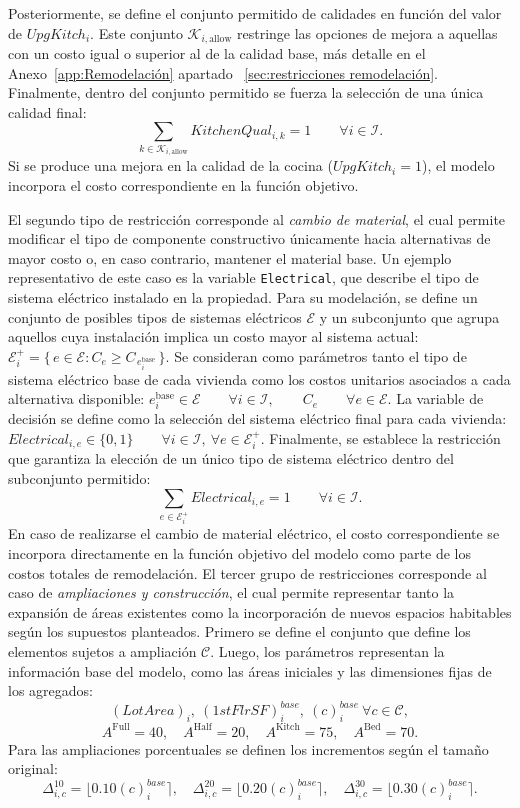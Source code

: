 Posteriormente, se define el conjunto permitido de calidades en función del valor de $UpgKitch_i$. Este conjunto $\mathcal{K}_{i,\text{allow}}$ restringe las opciones de mejora a aquellas con un costo igual o superior al de la calidad base, más detalle en el Anexo~\ref{app:Remodelación} apartado ~\ref{sec:restricciones remodelación}. Finalmente, dentro del conjunto permitido se fuerza la selección de una única calidad final:
\[
\sum_{k \in \mathcal{K}_{i,\text{allow}}} KitchenQual_{i,k} = 1 \qquad \forall i \in \mathcal{I}.
\]
Si se produce una mejora en la calidad de la cocina ($UpgKitch_i = 1$), el modelo incorpora el costo correspondiente en la función objetivo.

El segundo tipo de restricción corresponde al \textit{cambio de material}, el cual permite modificar el tipo de componente constructivo únicamente hacia alternativas de mayor costo o, en caso contrario, mantener el material base. Un ejemplo representativo de este caso es la variable \texttt{Electrical}, que describe el tipo de sistema eléctrico instalado en la propiedad. Para su modelación, se define un conjunto de posibles tipos de sistemas eléctricos $\mathcal{E}$ y un subconjunto que agrupa aquellos cuya instalación implica un costo mayor al sistema actual:
$\mathcal{E}^+_i = \{\, e \in \mathcal{E} : C_e \ge C_{\,e_i^{\text{base}}} \,\}.$ Se consideran como parámetros tanto el tipo de sistema eléctrico base de cada vivienda como los costos unitarios asociados a cada alternativa disponible:
$
e_i^{\text{base}} \in \mathcal{E} \qquad \forall i \in \mathcal{I},
\qquad
C_e \qquad \forall e \in \mathcal{E}.$
La variable de decisión se define como la selección del sistema eléctrico final para cada vivienda: $Electrical_{i,e} \in \{0,1\} \qquad \forall i \in \mathcal{I},\ \forall e \in \mathcal{E}^+_i.$
Finalmente, se establece la restricción que garantiza la elección de un único tipo de sistema eléctrico dentro del subconjunto permitido:
\[
\sum_{e \in \mathcal{E}^+_i} Electrical_{i,e} = 1
\qquad \forall i \in \mathcal{I}.
\]
En caso de realizarse el cambio de material eléctrico, el costo correspondiente se incorpora directamente en la función objetivo del modelo como parte de los costos totales de remodelación. El tercer grupo de restricciones corresponde al caso de \textit{ampliaciones y construcción}, el cual permite representar tanto la expansión de áreas existentes como la incorporación de nuevos espacios habitables según los supuestos planteados. Primero se define el conjunto que define los elementos sujetos a ampliación $\mathcal{C}$. Luego, los parámetros representan la información base del modelo, como las áreas iniciales y las dimensiones fijas de los agregados:
\[
(LotArea)_i, \ (1stFlrSF)_i^{base}, \ (c)_i^{base} \ \forall c \in \mathcal{C},
\]
\[
A^{\text{Full}}=40,\quad A^{\text{Half}}=20,\quad A^{\text{Kitch}}=75,\quad A^{\text{Bed}}=70.
\]
Para las ampliaciones porcentuales se definen los incrementos según el tamaño original:
\[
\Delta^{10}_{i,c}=\lfloor 0.10(c)_i^{base}\rceil,\quad
\Delta^{20}_{i,c}=\lfloor 0.20(c)_i^{base}\rceil,\quad
\Delta^{30}_{i,c}=\lfloor 0.30(c)_i^{base}\rceil.
\]

